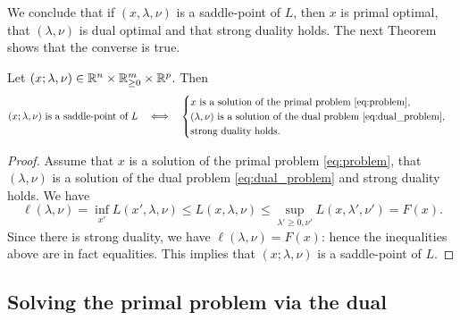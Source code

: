 \documentclass[11pt,nocut]{article}
\begin{document}
We conclude that if $(x,\lambda,\nu)$ is a saddle-point of $L$, then $x$ is primal optimal, that $(\lambda,\nu)$ is dual optimal and that strong duality holds. The next Theorem shows that the converse is true.

\begin{theorem}\label{th:saddle}
	Let $(x; \lambda,\nu) \in \mathbb{R}^n \times \mathbb{R}_{\geq 0}^m \times \mathbb{R}^p$. Then
	\vspace{-4mm}
	$$
	(x;\lambda,\nu) \ \text{is a saddle-point of} \ L
	\quad \Longleftrightarrow \quad
	\begin{cases}
x \ \text{is a solution of the primal problem} \ \eqref{eq:problem}, \\
(\lambda,\nu) \ \text{is a solution of the dual problem} \ \eqref{eq:dual_problem}, \\
	\text{strong duality holds.}
	\end{cases}
	$$
	\vspace{-3mm}
\end{theorem}
\begin{proof}
Assume that $x$ is a solution of the primal problem \eqref{eq:problem}, that $(\lambda,\nu)$ is a solution of the dual problem \eqref{eq:dual_problem} and strong duality holds.
We have
$$
\ell(\lambda,\nu) = \inf_{x'} L(x',\lambda,\nu) \leq
L(x,\lambda,\nu) \leq \sup_{\lambda' \geq 0, \nu'} L(x,\lambda',\nu') = F(x).
$$
Since there is strong duality, we have $\ell(\lambda,\nu) = F(x)$: hence the inequalities above are in fact equalities. This implies that $(x;\lambda,\nu)$ is a saddle-point of $L$.
\end{proof}

\subsection{Solving the primal problem via the dual}
\end{document}
